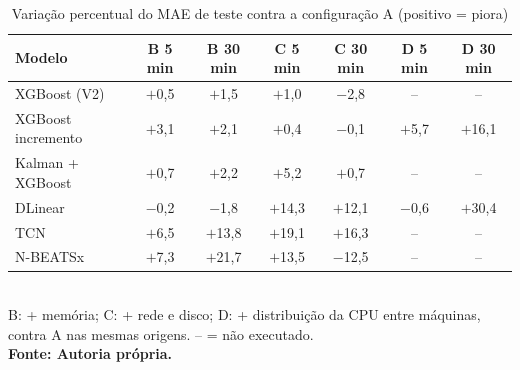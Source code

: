 \begin{table}[htb]
\caption{Variação percentual do MAE de teste contra a configuração A (positivo = piora)}
\label{tab:v3-ablacao}
\centering
\footnotesize
\setlength{\tabcolsep}{3pt}
\renewcommand{\arraystretch}{1.15}
\begin{tabular}{|l|c|c|c|c|c|c|}
\hline
\textbf{Modelo} & \textbf{B 5 min} & \textbf{B 30 min} & \textbf{C 5 min} & \textbf{C 30 min} & \textbf{D 5 min} & \textbf{D 30 min} \\
\hline
XGBoost (V2) & $+$0{,}5 & $+$1{,}5 & $+$1{,}0 & $-$2{,}8 & -- & -- \\
XGBoost incremento & $+$3{,}1 & $+$2{,}1 & $+$0{,}4 & $-$0{,}1 & $+$5{,}7 & $+$16{,}1 \\
Kalman + XGBoost & $+$0{,}7 & $+$2{,}2 & $+$5{,}2 & $+$0{,}7 & -- & -- \\
DLinear & $-$0{,}2 & $-$1{,}8 & $+$14{,}3 & $+$12{,}1 & $-$0{,}6 & $+$30{,}4 \\
TCN & $+$6{,}5 & $+$13{,}8 & $+$19{,}1 & $+$16{,}3 & -- & -- \\
N-BEATSx & $+$7{,}3 & $+$21{,}7 & $+$13{,}5 & $-$12{,}5 & -- & -- \\
\hline
\end{tabular}\\
\footnotesize B: + memória; C: + rede e disco; D: + distribuição da CPU entre máquinas, contra A nas mesmas origens. -- = não executado.\\
\textbf{\footnotesize Fonte: Autoria própria.}
\end{table}
